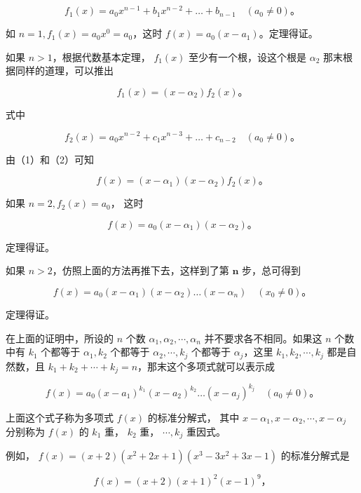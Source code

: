 \[
f _ {1} (x) = a _ {0} x ^ {n - 1} + b _ {1} x ^ {n - 2} + \dots + b _ {n - 1} \quad (a _ {0} \neq 0)\text{。}
\]

如 \(n = 1, f_{1}(x) = a_{0}x^{0} = a_{0}\)，这时
\(f(x) = a_{0}(x - a_{1})\)。定理得证。

如果 \(n > 1\)，根据代数基本定理， \(f_{1}(x)\) 至少有一个根，设这个根是
\(\alpha_{2}\) 那末根据同样的道理，可以推出

\[
f _ {1} (x) = \left(x - \alpha_ {2}\right) f _ {2} (x)\text{。} \tag {2}
\]

式中

\[
f _ {2} (x) = a _ {0} x ^ {n - 2} + c _ {1} x ^ {n - 3} + \dots + c _ {n - 2} \quad (a _ {0} \neq 0)\text{。}
\]

由（1）和（2）可知

\[
f (x) = \left(x - \alpha_ {1}\right) \left(x - \alpha_ {2}\right) f _ {2} (x)\text{。} \tag {3}
\]

如果 \(n = 2, f_{2}(x) = a_{0}\)， 这时

\[
f (x) = a _ {0} \left(x - \alpha_ {1}\right) \left(x - \alpha_ {2}\right)\text{。}
\]

定理得证。

如果 \(n > 2\)，仿照上面的方法再推下去，这样到了第 \(\pmb{n}\)
步，总可得到

\[
f (x) = a _ {0} \left(x - \alpha_ {1}\right) \left(x - \alpha_ {2}\right) \dots \left(x - \alpha_ {n}\right) \quad \left(x _ {0} \neq 0\right)\text{。} \tag {4}
\]

定理得证。

在上面的证明中，所设的 \(n\) 个数
\(\alpha_{1}, \alpha_{2}, \cdots, \alpha_{n}\) 并不要求各不相同。如果这
\(n\) 个数中有 \(k_{1}\) 个都等于 \(\alpha_{1}, k_{2}\) 个都等于
\(\alpha_{2}, \cdots, k_{j}\) 个都等于 \(\alpha_{j}\)，这里
\(k_{1}, k_{2}, \cdots, k_{j}\) 都是自然数，且
\(k_{1} + k_{2} + \cdots + k_{j} = n\)，那末这个多项式就可以表示成

\[
f (x) = a _ {0} \left(x - a _ {1}\right) ^ {k _ {1}} \left(x - a _ {2}\right) ^ {k _ {2}} \dots \left(x - a _ {j}\right) ^ {k _ {j}} \quad \left(a _ {0} \neq 0\right)\text{。} \tag {5}
\]

上面这个式子称为多项式 \(f(x)\) 的标准分解式， 其中
\(x - \alpha_{1}, x - \alpha_{2}, \cdots, x - \alpha_{j}\) 分别称为
\(f(x)\) 的 \(k_{1}\) 重， \(k_{2}\) 重， \(\cdots, k_{j}\) 重因式。

例如， \(f(x) = (x + 2)(x^2 + 2x + 1)(x^3 - 3x^2 + 3x - 1)\)
的标准分解式是

\[
f (x) = (x + 2) (x + 1) ^ {2} (x - 1) ^ {9}\text{，}
\]

